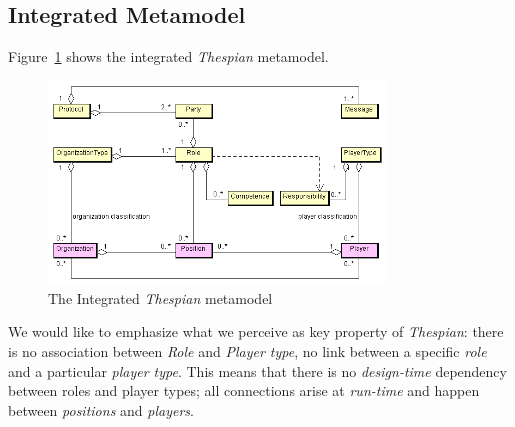 \subsection{Integrated Metamodel}

Figure~\ref{figure:thespian-integrated-metamodel} shows the integrated \textit{Thespian} metamodel.

\begin{figure}[ht]
	\centering
	\includegraphics[width=0.8\textwidth]{images/thespian/thespian-metamodel.png}
	\caption{The Integrated \textit{Thespian} metamodel}
	\label{figure:thespian-integrated-metamodel}
\end{figure}

We would like to emphasize what we perceive as key property of \textit{Thespian}: there is no association between \textit{Role} and \textit{Player type}, no link between a specific \textit{role} and a particular \textit{player type}.
This means that there is no \textit{design-time} dependency between roles and player types; all connections arise at \textit{run-time} and happen between \textit{positions} and \textit{players}.